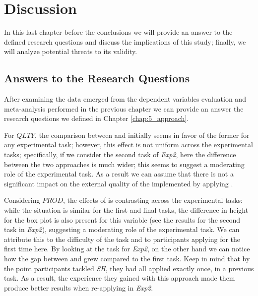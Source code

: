 \chapter{Discussion}
\label{chap:6_discussion}
In this last chapter before the conclusions we will provide an answer to the defined research questions and discuss the implications of this study; finally, we will analyze potential threats to its validity.

\section{Answers to the Research Questions}
After examining the data emerged from the dependent variables evaluation and meta-analysis performed in the previous chapter we can provide an answer the research questions we defined in Chapter \ref{chap:5_approach}.

For $QLTY$, the comparison between \tdd and \notdd initially seems in favor of the former for any experimental task; however, this effect is not uniform across the experimental tasks; specifically, if we consider the second task of \textit{Exp2}, here the difference between the two approaches is much wider; this seems to suggest a moderating role of the experimental task.
As a result we can assume that there is not a significant impact on the external quality of the implemented \es by applying \tdd. 

Considering $PROD$, the effects of \tdd is contrasting across the experimental tasks: while the situation is similar for the first and final tasks, the difference in height for the box plot is also present for this variable (see the results for the second task in \textit{Exp2}), suggesting a moderating role of the experimental task. We can attribute this to the difficulty of the task and to participants applying \tdd for the first time here. By looking at the task for \textit{Exp2}, on the other hand we can notice how the gap between \tdd and \notdd grew compared to the first task. Keep in mind that by the point participants tackled \textit{SH}, they had all applied \tdd exactly once, in a previous task. As a result, the experience they gained with this approach made them produce better results when re-applying \tdd in \textit{Exp2}.


